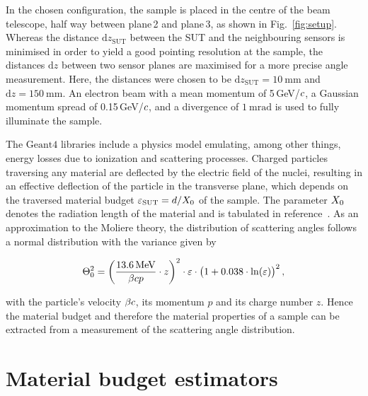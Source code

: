 \documentclass{PoS}
\newcommand{\eV}{\ensuremath{\textrm{eV}}}
\newcommand{\cspeed}{\ensuremath{\mathnormal{c}}}
\newcommand{\dz}{\ensuremath{\textrm{d}z}}
\newcommand{\dzsut}{\ensuremath{\textrm{d}z_{\textrm{SUT}}}}
\newcommand{\xzero}{\ensuremath{\mathnormal{X}_0}}
\newcommand{\Geant}{\ensuremath{\textrm{Geant4}}}
\begin{document}
In the chosen configuration, the sample is placed in the centre of the beam telescope, half way between plane\,2 and plane\,3, as shown in Fig.~\ref{fig:setup}. %
Whereas the distance $\dzsut$ between the SUT and the neighbouring sensors is minimised in order to yield a good pointing resolution at the sample,
 the distances $\dz$ between two sensor planes are maximised for a more precise angle measurement.
Here, the distances were chosen to be $\dzsut =\SI{10}{\mm}$ and $\dz=\SI{150}{\mm}$. 
An electron beam with a mean momentum of 5\,GeV/$\cspeed$, a Gaussian momentum spread of 0.15\,GeV/$\cspeed$, and a divergence of $\SI{1}{\milli\radian}$ is used to fully illuminate the sample. 

The $\Geant$ libraries include a physics model emulating, among other things, energy losses due to ionization and scattering processes.
Charged particles traversing any material are deflected by the electric field of the nuclei, resulting in an effective deflection of the particle in the transverse plane,
 which depends on the traversed material budget $\varepsilon_{\textrm{SUT}} = d / \xzero$ of the sample. 
The parameter $\xzero$ denotes the radiation length of the material and is tabulated in reference~\cite{ref:pdg2016}. 
As an approximation to the Moliere theory, the distribution of scattering angles follows a normal distribution with the variance given by~\cite{ref:scatteringhighland, ref:pdg2016} 

\begin{equation}
 \Theta_0^2 = \left( \frac{\SI{13.6}{\mega\eV}}{\beta \cspeed p}\cdot z \right)^2 \cdot \varepsilon \cdot \big( 1+0.038\cdot\ln(\varepsilon) \big)^2\,,
 \label{eq:highland}
\end{equation}

\noindent
with the particle's velocity $\beta \cspeed$, its momentum $p$ and its charge number $z$. 
Hence the material budget and therefore the material properties of a sample can be extracted from a measurement of the scattering angle distribution.


\section{Material budget estimators}
\end{document}
